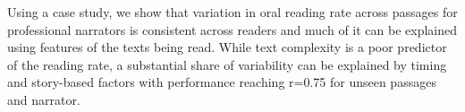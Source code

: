 Using a case study, we show that variation in oral reading rate across passages for professional narrators is consistent across readers and much of it can be explained using features of the texts being read. While text complexity is a poor predictor of the reading rate, a substantial share of variability can be explained by timing and story-based factors with performance reaching r=0.75 for unseen passages and narrator.

